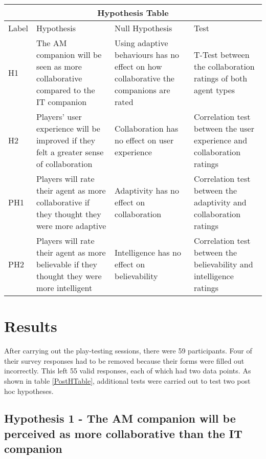 \documentclass{IEEEtran}
\begin{document}
\begin{table*}[t]\centering
\begin{tabular}{ |p{0.5cm}|p{6cm}|p{6cm}|p{5cm}|  }
 \hline
 \multicolumn{4}{|c|}{Hypothesis Table} \\
 \hline
 Label & Hypothesis & Null Hypothesis & Test\\
 \hline
    H1 & The AM companion will be seen as more collaborative compared to the IT companion & 
    Using adaptive behaviours has no effect on how collaborative the companions are rated &
    T-Test between the collaboration ratings of both agent types \\
 \hline
    H2 & Players' user experience will be improved if they felt a greater sense of collaboration & 
    Collaboration has no effect on user experience &
    Correlation test between the user experience and collaboration ratings\\
 \hline
    PH1 & Players will rate their agent as more collaborative if they thought they were more adaptive & 
    Adaptivity has no effect on collaboration &
    Correlation test between the adaptivity and collaboration ratings\\
 \hline
    PH2 & Players will rate their agent as more believable if they thought they were more intelligent & 
    Intelligence has no effect on believability &
    Correlation test between the believability and intelligence ratings\\
 \hline
\end{tabular}
\caption{Updated Hypothesis Table}
\label{PostHTable}
\end{table*}

\newpage

\section{Results}
\label{Results}


After carrying out the play-testing sessions, there were 59 participants. Four of their survey responses had to be removed because their forms were filled out incorrectly. This left 55 valid responses, each of which had two data points. As shown in table \ref{PostHTable}, additional tests were carried out to test two post hoc hypotheses.


\subsection{Hypothesis 1 - The AM companion will be perceived as more collaborative than the IT companion}
\end{document}
